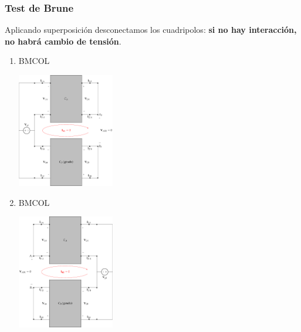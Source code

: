 \subsubsection{Test de Brune}
\label{sec:org2591d22}
Aplicando superposición desconectamos los cuadripolos: \textbf{si no hay interacción, no habrá cambio de tensión}.
\begin{enumerate}
\item \hfill{}\textsc{BMCOL}
\label{sec:org951e127}

\includegraphics[height=5cm]{../figs/paralelo-paralelo-brune-entrada.pdf}

\item \hfill{}\textsc{BMCOL}
\label{sec:orgc2f98c6}

\includegraphics[height=5cm]{../figs/paralelo-paralelo-brune-salida.pdf}

\end{enumerate}

